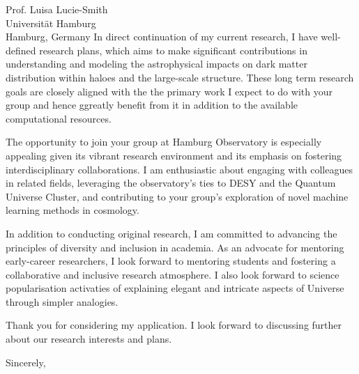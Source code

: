 \documentclass[11pt]{letter}
\begin{document}
\begin{letter}{Prof. Luisa Lucie-Smith \\ Universität Hamburg \\ Hamburg, Germany}
In direct continuation of my current research, I have well-defined research plans, which aims to make significant contributions in understanding and modeling the astrophysical impacts on dark matter distribution within haloes and the large-scale structure. These long term research goals are closely aligned with the the primary work I expect to do with your group and hence ggreatly benefit from it in addition to the available computational resources.

The opportunity to join your group at Hamburg Observatory is especially appealing given its vibrant research environment and its emphasis on fostering interdisciplinary collaborations. I am enthusiastic about engaging with colleagues in related fields, leveraging the observatory's ties to DESY and the Quantum Universe Cluster, and contributing to your group's exploration of novel machine learning methods in cosmology.

In addition to conducting original research, I am committed to advancing the principles of diversity and inclusion in academia. As an advocate for mentoring early-career researchers, I look forward to mentoring students and fostering a collaborative and inclusive research atmosphere. I also look forward to science popularisation activaties of explaining elegant and intricate aspects of Universe through simpler analogies.

Thank you for considering my application. I look forward to discussing further about our research interests and plans. 

\closing{Sincerely,}

\end{letter}
\end{document}
